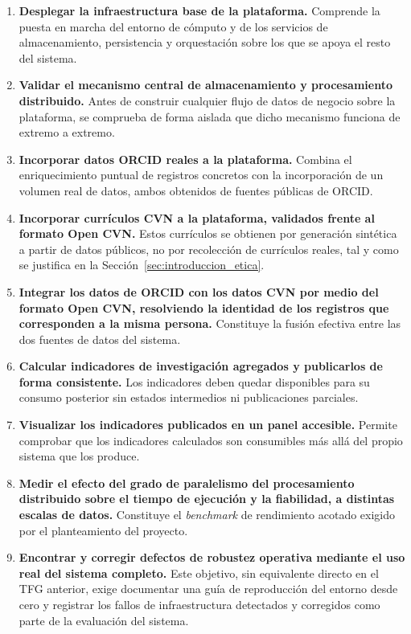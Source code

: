 \begin{enumerate}
  \item \textbf{Desplegar la infraestructura base de la plataforma.}
  Comprende la puesta en marcha del entorno de cómputo y de los servicios
  de almacenamiento, persistencia y orquestación sobre los que se apoya el
  resto del sistema.

  \item \textbf{Validar el mecanismo central de almacenamiento y
  procesamiento distribuido.} Antes de construir cualquier flujo de datos
  de negocio sobre la plataforma, se comprueba de forma aislada que dicho
  mecanismo funciona de extremo a extremo.

  \item \textbf{Incorporar datos ORCID reales a la plataforma.} Combina el
  enriquecimiento puntual de registros concretos con la incorporación de un
  volumen real de datos, ambos obtenidos de fuentes públicas de ORCID.

  \item \textbf{Incorporar currículos CVN a la plataforma, validados frente
  al formato Open CVN.} Estos currículos se obtienen por generación
  sintética a partir de datos públicos, no por recolección de currículos
  reales, tal y como se justifica en la Sección~\ref{sec:introduccion_etica}.

  \item \textbf{Integrar los datos de ORCID con los datos CVN por medio del
  formato Open CVN, resolviendo la identidad de los registros que
  corresponden a la misma persona.} Constituye la fusión efectiva entre las
  dos fuentes de datos del sistema.

  \item \textbf{Calcular indicadores de investigación agregados y
  publicarlos de forma consistente.} Los indicadores deben quedar
  disponibles para su consumo posterior sin estados intermedios ni
  publicaciones parciales.

  \item \textbf{Visualizar los indicadores publicados en un panel
  accesible.} Permite comprobar que los indicadores calculados son
  consumibles más allá del propio sistema que los produce.

  \item \textbf{Medir el efecto del grado de paralelismo del procesamiento
  distribuido sobre el tiempo de ejecución y la fiabilidad, a distintas
  escalas de datos.} Constituye el \textit{benchmark} de rendimiento
  acotado exigido por el planteamiento del proyecto.

  \item \textbf{Encontrar y corregir defectos de robustez operativa mediante
  el uso real del sistema completo.} Este objetivo, sin equivalente directo
  en el TFG anterior, exige documentar una guía de reproducción del entorno
  desde cero y registrar los fallos de infraestructura detectados y
  corregidos como parte de la evaluación del sistema.
\end{enumerate}

